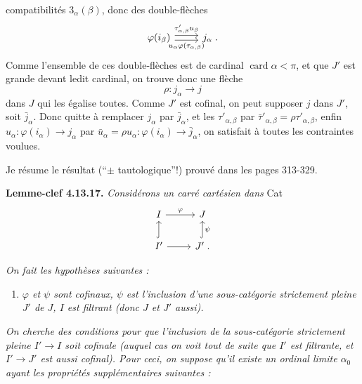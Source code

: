 \documentclass[11pt]{article}
\newcommand{\printedpage}[1]{\marginpar{\footnotesize p.~#1}}
\newcommand{\msp}[1]{\marginpar{\footnotesize [#1]}}
\DeclareMathOperator{\card}{card}
\begin{document}
\printedpage{124}

compatibilités $3_\alpha(\beta)$, donc des double-flèches
\[
\begin{tikzcd}
\varphi(i_\beta) \arrow[r, shift left, "\tau'_{\alpha,\beta}u_\beta"] \arrow[r, shift right, "u_\alpha\varphi(\tau_{\alpha,\beta})"'] & j_\alpha \; .
\end{tikzcd}
\]
Comme l'ensemble de ces double-flèches est de cardinal $\card\alpha < \pi$, et que $J'$ est grande devant ledit cardinal, on
\msp{page 329}
trouve donc une flèche
\[
\rho : j_\alpha \longrightarrow j
\]
dans $J$ qui les égalise toutes. Comme $J'$ est cofinal, on peut supposer $j$ dans $J'$, soit $\bar{j}_\alpha$. Donc quitte à remplacer $j_\alpha$ par $\bar{j}_\alpha$, et les $\tau'_{\alpha,\beta}$ par $\bar{\tau}'_{\alpha,\beta} = \rho\tau'_{\alpha,\beta}$, enfin $u_\alpha : \varphi(i_\alpha) \longrightarrow j_\alpha$ par $\bar{u}_\alpha = \rho u_\alpha : \varphi(i_\alpha) \longrightarrow \bar{j}_\alpha$, on satisfait à toutes les contraintes voulues.

Je résume le résultat (``$\pm$ tautologique''!) prouvé dans les pages 313-329.

\textbf{Lemme-clef 4.13.17.} \textit{Considérons un carré cartésien dans} Cat
\[
\begin{tikzcd}
I \arrow[r, "\varphi"] & J \\
I' \arrow[u, hook] \arrow[r] & J' \arrow[u, hook, "\psi"'] \; .
\end{tikzcd}
\]

\textit{On fait les hypothèses suivantes :}

\msp{page 330}

\begin{enumerate}[label={}]
\item[\textit{1)}] \textit{$\varphi$ et $\psi$ sont cofinaux, $\psi$ est l'inclusion d'une sous-catégorie strictement pleine $J'$ de $J$, $I$ est filtrant (donc $J$ et $J'$ aussi).}
\end{enumerate}

\textit{On cherche des conditions pour que l'inclusion de la sous-catégorie strictement pleine $I' \longrightarrow I$ soit cofinale (auquel cas on voit tout de suite que $I'$ est filtrante, et $I' \longrightarrow J'$ est aussi cofinal). Pour ceci, on suppose qu'il existe un \textup{ordinal limite} $\alpha_0$ ayant les propriétés supplémentaires suivantes :}
\end{document}
